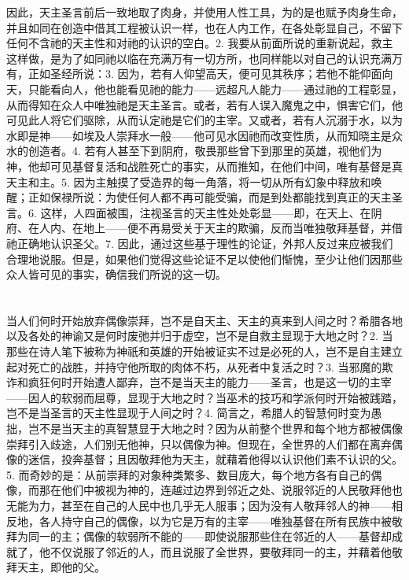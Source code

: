 因此，天主圣言前后一致地取了肉身，并使用人性工具，为的是也赋予肉身生命，并且如同在创造中借其工程被认识一样，也在人内工作，在各处彰显自己，不留下任何不含祂的天主性和对祂的认识的空白。2. 我要从前面所说的重新说起，救主这样做，是为了如同祂以临在充满万有一切方所，也同样能以对自己的认识充满万有，正如圣经所说：3. 因为，若有人仰望高天，便可见其秩序；若他不能仰面向天，只能看向人，他也能看见祂的能力——远超凡人能力——通过祂的工程彰显，从而得知在众人中唯独祂是天主圣言。或者，若有人误入魔鬼之中，惧害它们，他可见此人将它们驱除，从而认定祂是它们的主宰。又或者，若有人沉溺于水，以为水即是神——如埃及人崇拜水一般——他可见水因祂而改变性质，从而知晓主是众水的创造者。4. 若有人甚至下到阴府，敬畏那些曾下到那里的英雄，视他们为神，他却可见基督复活和战胜死亡的事实，从而推知，在他们中间，唯有基督是真天主和主。5. 因为主触摸了受造界的每一角落，将一切从所有幻象中释放和唤醒；正如保禄所说：为使任何人都不再可能受骗，而是到处都能找到真正的天主圣言。6. 这样，人四面被围，注视圣言的天主性处处彰显——即，在天上、在阴府、在人内、在地上——便不再易受关于天主的欺骗，反而当唯独敬拜基督，并借祂正确地认识圣父。7. 因此，通过这些基于理性的论证，外邦人反过来应被我们合理地说服。但是，如果他们觉得这些论证不足以使他们惭愧，至少让他们因那些众人皆可见的事实，确信我们所说的这一切。\par


\section{}

当人们何时开始放弃偶像崇拜，岂不是自天主、天主的真来到人间之时？希腊各地以及各处的神谕又是何时废弛并归于虚空，岂不是自救主显现于大地之时？2. 当那些在诗人笔下被称为神祇和英雄的开始被证实不过是必死的人，岂不是自主建立起对死亡的战胜，并持守他所取的肉体不朽，从死者中复活之时？3. 当邪魔的欺诈和疯狂何时开始遭人鄙弃，岂不是当天主的能力——圣言，也是这一切的主宰——因人的软弱而屈尊，显现于大地之时？当巫术的技巧和学派何时开始被践踏，岂不是当圣言的天主性显现于人间之时？4. 简言之，希腊人的智慧何时变为愚拙，岂不是当天主的真智慧显于大地之时？因为从前整个世界和每个地方都被偶像崇拜引入歧途，人们别无他神，只以偶像为神。但现在，全世界的人们都在离弃偶像的迷信，投奔基督；且因敬拜他为天主，就藉着他得以认识他们素不认识的父。5. 而奇妙的是：从前崇拜的对象种类繁多、数目庞大，每个地方各有自己的偶像，而那在他们中被视为神的，连越过边界到邻近之处、说服邻近的人民敬拜他也无能为力，甚至在自己的人民中也几乎无人服事；因为没有人敬拜邻人的神——相反地，各人持守自己的偶像，以为它是万有的主宰——唯独基督在所有民族中被敬拜为同一的主；偶像的软弱所不能的——即使说服那些住在邻近的人——基督却成就了，他不仅说服了邻近的人，而且说服了全世界，要敬拜同一的主，并藉着他敬拜天主，即他的父。\par

